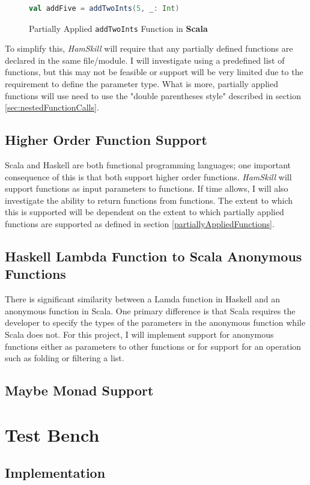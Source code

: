 \documentclass{report}
\begin{document}
\begin{figure}[H]
\begin{mdframed}
\begin{lstlisting}[language=Scala]
val addFive = addTwoInts(5, _: Int)
\end{lstlisting}
\end{mdframed}
\caption{Partially Applied {\tt addTwoInts} Function in \textbf{Scala}}\label{fig:addFiveScala}
\end{figure}

To simplify this, \emph{HamSkill} will require that any partially defined functions are declared in the same file/module.  I will investigate using a predefined list of functions, but this may not be feasible or support will be very limited due to the requirement to define the parameter type.  What is more, partially applied functions will use need to use the "double parentheses style" described in section \ref{sec:nestedFunctionCalls}.

\subsection{Higher Order Function Support}\label{sec:higherOrderFunctions}

Scala and Haskell are both functional programming languages; one important consequence of this is that both support higher order functions.  \emph{HamSkill} will support functions as input parameters to functions.  If time allows, I will also investigate the ability to return functions from functions.  The extent to which this is supported will be dependent on the extent to which partially applied functions are supported as defined in section \ref{partiallyAppliedFunctions}.

\subsection{Haskell Lambda Function to Scala Anonymous Functions}\label{sec:lambdaAnonymousFunctions}

There is significant similarity between a Lamda function in Haskell and an anonymous function in Scala.  One primary difference is that Scala requires the developer to specify the types of the parameters in the anonymous function while Scala does not. For this project, I will implement support for anonymous functions either as parameters to other functions or for support for an operation such as folding or filtering a list. 

\subsection{Maybe Monad Support}

\section{Test Bench}

\subsection{Implementation}

\pagebreak


\end{document}

